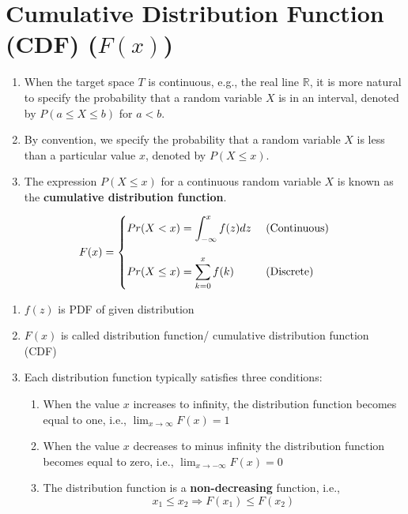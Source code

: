 \chapter{Cumulative Distribution Function (CDF) ($F(x)$) \cite{ism-1,mfml-1}}\label{Cumulative Distribution Function (CDF)}

\begin{enumerate}
    \item When the target space $T$ is continuous, e.g., the real line $\mathbb{R}$, it is more natural to specify the probability that a random variable $X$ is in an interval, denoted by $P(a \leq X \leq b)$ for $a < b$. \cite{mfml-1}
    \item By convention, we specify the probability that a random variable $X$ is less than a particular value $x$, denoted by $P(X \leq x)$. \cite{mfml-1}
    \item The expression $P(X \leq x)$ for a continuous random variable $X$ is known as the \textbf{cumulative distribution function}. \cite{mfml-1}

\end{enumerate}

\[
\begin{aligned}
    F(x) 
    = \begin{dcases}
        Pr(X < x) = \displaystyle\int_{-\infty}^{x} f(z) dz & \text{ (Continuous)}\\[2ex]
        Pr(X \leq x) = \displaystyle\sum_{k=0}^x f(k) & \text{ (Discrete)}\\
    \end{dcases}
\end{aligned}
\]


\begin{enumerate}
    \item $f(z)$ is PDF of given distribution

    \item $F(x)$ is called distribution function/ cumulative distribution function (CDF)

    \item Each distribution function typically satisfies three conditions:
    \begin{enumerate}
        \item When the value $x$ increases to infinity, the distribution function becomes equal to one, i.e., $\displaystyle\lim_{x\to \infty} F(x) = 1$

        \item When the value $x$ decreases to minus infinity the distribution function becomes equal to zero, i.e., $\displaystyle\lim_{x\to-\infty} F(x) = 0$

        \item The distribution function is a \textbf{non-decreasing} function, i.e.,
        \[
            x_1 \leq x_2 \Rightarrow F(x_1) \leq F(x_2)
        \]
        
    \end{enumerate}
    
\end{enumerate}

